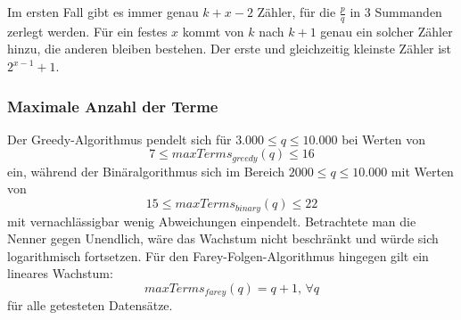 Im ersten Fall gibt es immer genau $k+x-2$ Zähler, für die $\frac{p}{q}$ in 3 Summanden zerlegt werden. Für ein festes $x$ kommt von $k$ nach $k+1$ genau ein solcher Zähler hinzu, die anderen bleiben bestehen. Der erste und gleichzeitig kleinste Zähler ist $2^{x-1}+1$.




\subsubsection{Maximale Anzahl der Terme}
 Der Greedy-Algorithmus pendelt sich für $3.000 \leq q \leq 10.000$ bei Werten von $$7 \leq maxTerms_{greedy}(q) \leq 16$$ ein, während der Binäralgorithmus sich im Bereich $2000 \leq q \leq 10.000$ mit Werten von $$15 \leq maxTerms_{binary}(q) \leq 22$$ mit vernachlässigbar wenig Abweichungen einpendelt. Betrachtete man die Nenner gegen Unendlich, wäre das Wachstum nicht beschränkt und würde sich logarithmisch fortsetzen. Für den Farey-Folgen-Algorithmus hingegen gilt ein lineares Wachstum:
$$maxTerms_{farey}(q) = q + 1, \, \forall q$$
für alle getesteten Datensätze. 


